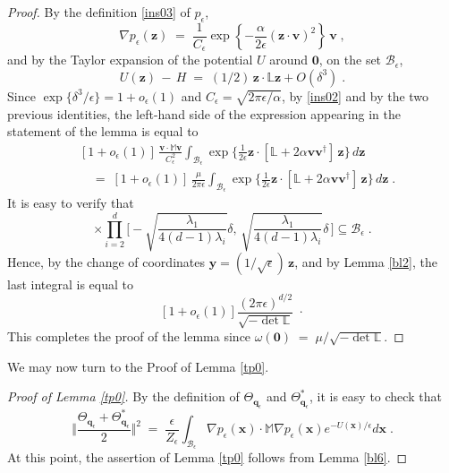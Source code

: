 \documentclass[reqno]{amsart}
\newcounter{as}[section]
\newcommand{\mc}[1]{{\mathcal #1}}
\newcommand{\bb}[1]{{\mathbb #1}}
\newcommand{\bs}[1]{{\boldsymbol #1}}
\newcommand{\<}{\langle}
\renewcommand{\>}{\rangle}
\begin{document}
\begin{proof}
By the definition \eqref{ins03} of $p_{\epsilon}$,
\begin{equation*}
\nabla p_{\epsilon}(\bs{z})\;=\;\frac{1}{C_{\epsilon}}
\exp\left\{ -\frac{\alpha}{2\epsilon}(\bs{z}\cdot\bs{v})^{2}\right\}
\,\bs{v}\;,
\end{equation*}
and by the Taylor expansion of the potential $U$ around $\bs{0}$, on
the set $\mc{B}_{\epsilon}$,
\begin{equation*}
U(\bs{z})\,-\,H\;=\;(1/2)\, \bs{z}\cdot\bb{L}\bs{z}+O(\delta^{3})\;.
\end{equation*}
Since $\exp\{\delta^3/\epsilon\} = 1 + o_{\epsilon}(1)$ and
$C_\epsilon = \sqrt{2\pi\epsilon/\alpha}$, by \eqref{ins02} and by the
two previous identities, the left-hand side of the expression appearing
in the statement of the lemma is equal to
\begin{align*}
 &  \left[1+o_{\epsilon}(1)\right]\,
\frac{\bs{v}\cdot\bb{M}\bs{v}}{C_{\epsilon}^{2}}
\int_{\mc{B}_{\epsilon}}\exp \Big\{ \frac{1}{2\epsilon}
\bs{z}\cdot [\bb{L}+2\alpha\bs{v}\bs{v}^{\dagger}]\, \bs{z}\Big\} \, d\bs{z}\\
 &  \quad =\;\left[1+o_{\epsilon}(1)\right]\,
\frac{\mu}{2\pi\epsilon} \int_{\mc{B}_{\epsilon}}
\exp\Big\{ \frac{1}{2\epsilon}\bs{z}\cdot
[\bb{L}+2\alpha\bs{v}\bs{v}^{\dagger} ]\, \bs{z}\Big\} \, d\bs{z}\;.
\end{align*}
It is easy to verify that
\begin{equation*}
[-\delta,\,\delta]\times \prod_{i=2}^d
\Big[-\sqrt{\frac{\lambda_1}{4(d-1)\lambda_i}}\delta ,\,
\sqrt{\frac{\lambda_1}{4(d-1)\lambda_i}}\delta \, \Big] \subseteq \mc{B}_\epsilon\;.
\end{equation*}
Hence, by the change of coordinates $\bs{y}= (1/\sqrt{\epsilon}) \,
\bs{z}$, and by Lemma \ref{bl2}, the last integral is equal to
\begin{equation*}
\left[1+o_{\epsilon}(1)\right]\frac{(2\pi\epsilon)^{d/2}}
{\sqrt{-\det\bb{L}}}\;\cdot
\end{equation*}
This completes the proof of the lemma since
$\omega(\bs{0})\;=\;\mu/\sqrt{-\det\bb{L}}$.
\end{proof}

We may now turn to the Proof of Lemma \ref{tp0}.

\begin{proof}[Proof of Lemma \ref{tp0}]
By the definition of $\Theta_{\bs{q}_{\epsilon}}$ and
$\Theta_{\bs{q}_{\epsilon}}^{*}$, it is easy to check that
\begin{equation*}
\Big\Vert \frac{\Theta_{\bs{q}_{\epsilon}}+
\Theta_{\bs{q}_{\epsilon}}^{*}}{2}\Big\Vert ^{2}
\;=\; \frac{\epsilon}{Z_{\epsilon}}
\int_{\mc{B}_{\epsilon}}\nabla p_{\epsilon}(\bs{x})\cdot\bb{M}
\nabla p_{\epsilon}(\bs{x})e^{-U(\bs{x})/\epsilon}d\bs{x}\;.
\end{equation*}
At this point, the assertion of Lemma \ref{tp0} follows from
Lemma \ref{bl6}.
\end{proof}
\end{document}
